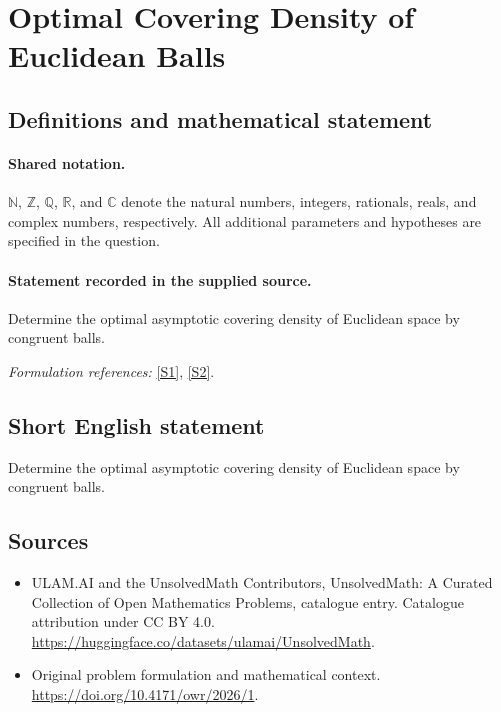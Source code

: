 \documentclass[11pt]{article}
\newcommand{\sref}[2]{\hyperlink{source:#1:#2}{[S#2]}}
\begin{document}
\section{Optimal Covering Density of Euclidean Balls}\label{statement}

\subsection{Definitions and mathematical statement}

\paragraph{Shared notation.}$\mathbb N$, $\mathbb Z$, $\mathbb Q$, $\mathbb R$, and $\mathbb C$ denote the natural numbers, integers, rationals, reals, and complex numbers, respectively. All additional parameters and hypotheses are specified in the question.


\paragraph{Statement recorded in the supplied source.}
Determine the optimal asymptotic covering density of Euclidean space by congruent balls.
\par\smallskip\textit{Formulation references:} \sref{statement}{1}, \sref{statement}{2}.
\subsection{Short English statement}
Determine the optimal asymptotic covering density of Euclidean space by congruent balls.
\subsection{Sources}
\begin{itemize}
\item[\hypertarget{source:statement:1}{S1}] ULAM.AI and the UnsolvedMath Contributors, UnsolvedMath: A Curated Collection of Open Mathematics Problems, catalogue entry. Catalogue attribution under CC BY 4.0.
\url{https://huggingface.co/datasets/ulamai/UnsolvedMath}.
\item[\hypertarget{source:statement:2}{S2}] Original problem formulation and mathematical context.
\url{https://doi.org/10.4171/owr/2026/1}.
\end{itemize}
\label{end:statement}
\end{document}
